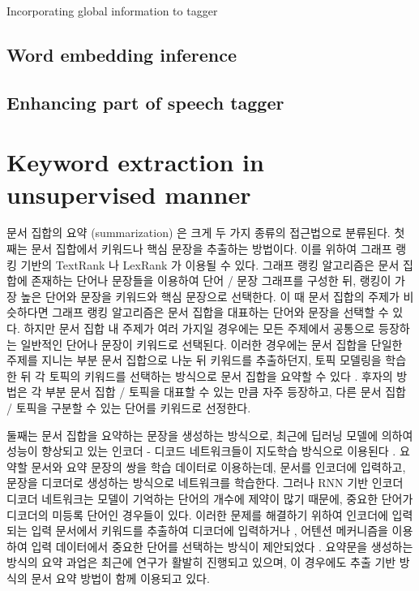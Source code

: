 \documentclass[11pt]{article}
\begin{document}
Incorporating global information to tagger \citep{zhao2007incorporating} 

\subsection{Word embedding inference}


\subsection{Enhancing part of speech tagger}



\section{Keyword extraction in unsupervised manner}

문서 집합의 요약 (summarization) 은 크게 두 가지 종류의 접근법으로 분류된다.
첫째는 문서 집합에서 키워드나 핵심 문장을 추출하는 방법이다.
이를 위하여 그래프 랭킹 기반의 TextRank \citep{mihalcea2004textrank} 나 LexRank \citep{erkan2004lexrank} 가 이용될 수 있다.
그래프 랭킹 알고리즘은 문서 집합에 존재하는 단어나 문장들을 이용하여 단어 / 문장 그래프를 구성한 뒤, 랭킹이 가장 높은 단어와 문장을 키워드와 핵심 문장으로 선택한다.
이 때 문서 집합의 주제가 비슷하다면 그래프 랭킹 알고리즘은 문서 집합을 대표하는 단어와 문장을 선택할 수 있다.
하지만 문서 집합 내 주제가 여러 가지일 경우에는 모든 주제에서 공통으로 등장하는 일반적인 단어나 문장이 키워드로 선택된다.
이러한 경우에는 문서 집합을 단일한 주제를 지니는 부분 문서 집합으로 나눈 뒤 키워드를 추출하던지, 토픽 모델링을 학습한 뒤 각 토픽의 키워드를 선택하는 방식으로 문서 집합을 요약할 수 있다 \citep{chuang2012termite, sievert2014ldavis}.
후자의 방법은 각 부분 문서 집합 / 토픽을 대표할 수 있는 만큼 자주 등장하고, 다른 문서 집합 / 토픽을 구분할 수 있는 단어를 키워드로 선정한다.

둘째는 문서 집합을 요약하는 문장을 생성하는 방식으로, 최근에 딥러닝 모델에 의하여 성능이 향상되고 있는 인코더 - 디코드 네트워크들이 지도학습 방식으로 이용된다 \citep{rush2015neural}.
요약할 문서와 요약 문장의 쌍을 학습 데이터로 이용하는데, 문서를 인코더에 입력하고, 문장을 디코더로 생성하는 방식으로 네트워크를 학습한다.
그러나 RNN 기반 인코더 디코더 네트워크는 모델이 기억하는 단어의 개수에 제약이 많기 때문에, 중요한 단어가 디코더의 미등록 단어인 경우들이 있다.
이러한 문제를 해결하기 위하여 인코더에 입력되는 입력 문서에서 키워드를 추출하여 디코더에 입력하거나 \citep{nallapati2016abstractive}, 어텐션 메커니즘을 이용하여 입력 데이터에서 중요한 단어를 선택하는 방식이 제안되었다 \citep{see2017get, gu2016incorporating}.
요약문을 생성하는 방식의 요약 과업은 최근에 연구가 활발히 진행되고 있으며, 이 경우에도 추출 기반 방식의 문서 요약 방법이 함께 이용되고 있다.
\end{document}
